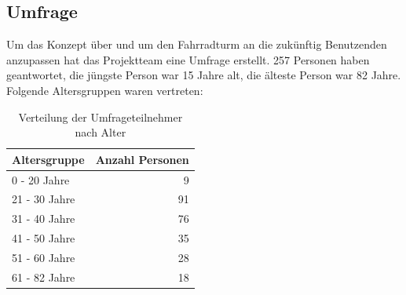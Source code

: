 \subsection{Umfrage}
Um das Konzept über und um den Fahrradturm an die zukünftig Benutzenden anzupassen hat das Projektteam eine Umfrage erstellt. 257 Personen haben geantwortet, die jüngste Person war 15 Jahre alt, die älteste Person war 82 Jahre. Folgende Altersgruppen waren vertreten:


\begin{table}[H]
    \centering
    \begin{tabular}{lr}
        \toprule
        Altersgruppe  & Anzahl Personen \\
        \midrule
        0 - 20 Jahre  & 9               \\
        21 - 30 Jahre & 91              \\
        31 - 40 Jahre & 76              \\
        41 - 50 Jahre & 35              \\
        51 - 60 Jahre & 28              \\
        61 - 82 Jahre & 18              \\
        \bottomrule
    \end{tabular}
    \caption{Verteilung der Umfrageteilnehmer nach Alter}
    \label{tab:umfragealter}
\end{table}

